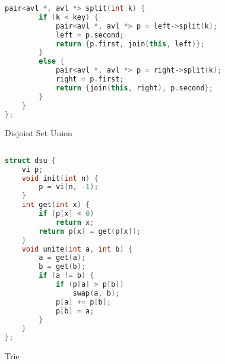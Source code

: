 \documentclass[leter]{amsart}
\begin{document}
\begin{multicols}{2}
\begin{lstlisting}[language=C++]
    pair<avl *, avl *> split(int k) {
        if (k < key) {
            pair<avl *, avl *> p = left->split(k);
            left = p.second;
            return {p.first, join(this, left)};
        }
        else {
            pair<avl *, avl *> p = right->split(k);
            right = p.first;
            return {join(this, right), p.second};
        }
    }
};


\end{lstlisting}
\end{multicols}
Disjoint Set Union
\begin{multicols}{2}
\begin{lstlisting}[language=C++]
 
struct dsu {
    vi p;
    void init(int n) {
        p = vi(n, -1);
    }
    int get(int x) {
        if (p[x] < 0)
            return x;
        return p[x] = get(p[x]);
    }
    void unite(int a, int b) {
        a = get(a);
        b = get(b);
        if (a != b) {
            if (p[a] > p[b])
                swap(a, b);
            p[a] += p[b];
            p[b] = a;
        }
    }
};


\end{lstlisting}
\end{multicols}
Trie
\end{document}
